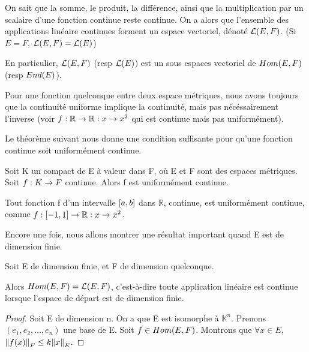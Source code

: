 On sait que la somme, le produit, la différence, ainsi que la multiplication par
un scalaire d'une fonction continue reste continue. On a alors que l'ensemble
des applications linéaire continues forment un espace vectoriel, dénoté
$\mathcal{L}(E, F)$. (Si $E = F$, $\mathcal{L}(E, F) =
\mathcal{L}(E)$)

En particulier, $\mathcal{L}(E, F)$ (resp $\mathcal{L}(E)$) est un sous
espaces vectoriel de $Hom(E, F)$ (resp $End(E)$).

\begin{remarque}
	Pour une fonction quelconque entre deux espace métriques, nous avons
	toujours que la continuité uniforme implique la continuité, mais pas
	nécéssairement l'inverse (voir $f : \mathbb{R} \rightarrow \mathbb{R} : x \rightarrow x^2$ qui est continue mais pas uniformément).
\end{remarque}

Le théorème suivant nous donne une condition suffisante pour qu'une fonction
continue soit uniformément continue.

\begin{theorem} [Heine]
	Soit K un compact de E à valeur dans F, où E et F sont des espaces
	métriques. Soit $f : K \rightarrow F$ continue. Alors f est uniformément
	continue.
	\label{Heine}
\end{theorem}

\begin{exemple}
	Tout fonction f d'un intervalle $\left[a, b\right]$ dans $\mathbb{R}$, continue, est
	uniformément continue, comme
	$f : \left[-1, 1\right] \rightarrow \mathbb{R} : x \rightarrow x^2$.
\end{exemple}

Encore une fois, nous allons montrer une résultat important quand E est de
dimension finie.

\begin{proposition}
	Soit E de dimension finie, et F de dimension quelconque.
	
	Alors $Hom(E, F) = \mathcal{L}(E, F)$, c'est-à-dire toute
	application linéaire est continue lorsque l'espace de départ est de
	dimension finie.
\end{proposition}

\begin{proof}
	Soit E de dimension n.
	On a que E est isomorphe à $\mathbb{K}^{n}$. Prenons $(e_{1}, e_{2}, \ldots,
	e_{n})$ une base de E.
	Soit $f \in Hom(E, F)$. Montrons que $\forall x \in E$,
	$\norm{f(x)}_{F} \leq k\norm{x}_{E}$.
\end{proof}


